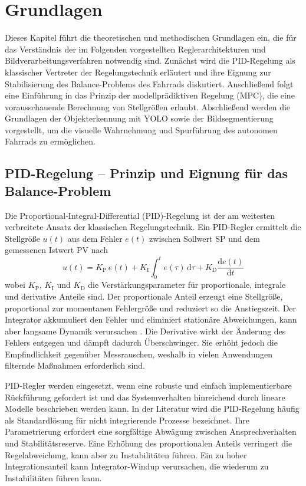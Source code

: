 \section{Grundlagen}
Dieses Kapitel führt die theoretischen und methodischen Grundlagen ein, die für das Verständnis der im Folgenden vorgestellten 
Reglerarchitekturen und Bildverarbeitungsverfahren notwendig sind. Zunächst wird die PID-Regelung als klassischer Vertreter der 
Regelungstechnik erläutert und ihre Eignung zur Stabilisierung des Balance-Problems des Fahrrads diskutiert. 
Anschließend folgt eine Einführung in das Prinzip der modellprädiktiven Regelung (MPC), die eine vorausschauende Berechnung von 
Stellgrößen erlaubt. Abschließend werden die Grundlagen der Objekt­erkennung 
mit YOLO sowie der Bildsegmentierung vorgestellt, um die visuelle Wahrnehmung und Spurführung des autonomen Fahrrads zu ermöglichen.

\subsection{PID-Regelung – Prinzip und Eignung für das Balance-Problem}

Die Proportional‑Integral‑Differential (PID)‑Regelung ist der am weitesten verbreitete Ansatz der klassischen Regelungstechnik. 
Ein PID‑Regler ermittelt die Stellgröße \(u(t)\) aus dem Fehler \(e(t)\) zwischen Sollwert \(\text{SP}\) und dem gemessenen Istwert \(\text{PV}\) nach
\begin{equation}
  u(t)=K_{\mathrm{P}}\,e(t) + K_{\mathrm{I}}\int_0^t e(\tau)\,\mathrm{d}\tau + K_{\mathrm{D}}\frac{\mathrm{d}e(t)}{\mathrm{d}t}
  \label{eq:pid}
\end{equation}
wobei \(K_{\mathrm{P}}\), \(K_{\mathrm{I}}\) und \(K_{\mathrm{D}}\) die Verstärkungsparameter für proportionale, integrale und 
derivative Anteile sind.  Der proportionale Anteil erzeugt eine Stellgröße, proportional zur momentanen 
Fehlergröße und reduziert so die Anstiegszeit.  Der Integrator akkumuliert den Fehler und eliminiert stationäre Abweichungen, kann 
aber langsame Dynamik verursachen \citep{apmonitor_pid}.  Die Derivative wirkt der Änderung des Fehlers entgegen und dämpft dadurch Überschwinger. Sie 
erhöht jedoch die Empfindlichkeit gegenüber Messrauschen, weshalb in vielen Anwendungen filternde Maßnahmen erforderlich sind.

PID‑Regler werden eingesetzt, wenn eine robuste und einfach implementierbare Rückführung 
gefordert ist und das Systemverhalten 
hinreichend durch lineare Modelle beschrieben werden kann.  In der Literatur wird die PID‑Regelung häufig als Standardlösung für 
nicht integrierende Prozesse bezeichnet.  Ihre Parametrierung erfordert eine sorgfältige Abwägung zwischen 
Ansprechverhalten und Stabilitätsreserve. Eine Erhöhung des proportionalen Anteils verringert die Regelabweichung, kann aber zu
 Instabilitäten führen. Ein zu hoher Integrationsanteil kann Integrator‑Windup verursachen, die wiederum zu Instabilitäten führen kann.

